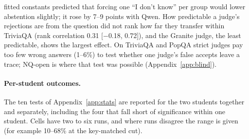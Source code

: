 \documentclass[11pt,a4paper,twocolumn]{article}
\newcommand{\idk}{``I don't know''}
\begin{document}
fitted constants predicted that forcing one \idk{} per group would lower abstention slightly; it rose by 7--9 points with Qwen. How predictable a judge's rejections are from the question did not rank how far they transfer within TriviaQA (rank correlation 0.31 [$-$0.18, 0.72]), and the Granite judge, the least predictable, shows the largest effect. On TriviaQA and PopQA strict judges pay too few wrong answers (1--6\%) to test whether one judge's false accepts leave a trace; NQ-open is where that test was possible (Appendix~\ref{app:blind}).

\paragraph{Per-student outcomes.} The ten tests of Appendix~\ref{app:stats} are reported for the two students together and separately, including the four that fall short of significance within one student. Cells have two to six runs, and where runs disagree the range is given (for example 10--68\% at the key-matched cut).
\end{document}
